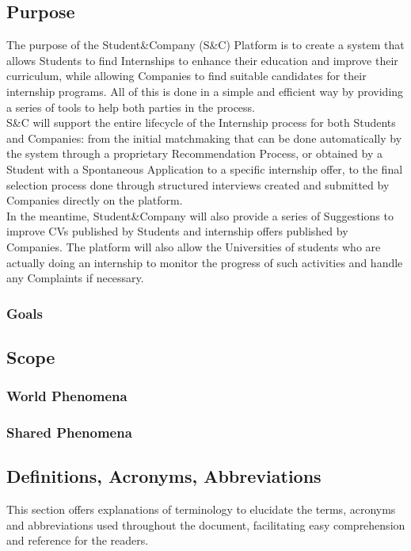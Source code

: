 \subsection{Purpose}
The purpose of the Student\&Company (S\&C) Platform is to create a system that allows Students to find Internships to enhance their education and improve their curriculum, while allowing Companies to find suitable candidates for their internship programs. All of this is done in a simple and efficient way by providing a series of tools to help both parties in the process.\\
S\&C will support the entire lifecycle of the Internship process for both Students and Companies: from the initial matchmaking that can be done automatically by the system through a proprietary Recommendation Process, or obtained by a Student with a Spontaneous Application to a specific internship offer, to the final selection process done through structured interviews created and submitted by Companies directly on the platform.\\%
In the meantime, Student\&Company will also provide a series of Suggestions to improve CVs published by Students and internship offers published by Companies. The platform will also allow the Universities of students who are actually doing an internship to monitor the progress of such activities and handle any Complaints if necessary.
\subsubsection{Goals}


\subsection{Scope}

\subsubsection{World Phenomena}

\subsubsection{Shared Phenomena}


\subsection{Definitions, Acronyms, Abbreviations}  
This section offers explanations of terminology to elucidate the terms, acronyms and abbreviations used throughout the document, facilitating easy comprehension and reference for the readers.
